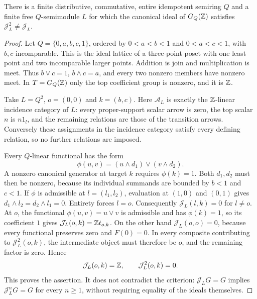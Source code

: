 \begin{proposition}
\label{prop:canonical-nonidempotent}
There is a finite distributive, commutative, entire idempotent semiring
$Q$ and a finite free $Q$-semimodule $L$ for which the canonical ideal
of $G_Q(\mathbb Z)$ satisfies $\mathcal J_L^2\ne\mathcal J_L$.
\end{proposition}
\begin{proof}
Let $Q=\{0,a,b,c,1\}$, ordered by
$0<a<b<1$ and $0<a<c<1$, with $b,c$ incomparable.
This is the ideal lattice of a three-point poset with one least point
and two incomparable larger points. Addition is join and multiplication
is meet. Thus $b\vee c=1$, $b\wedge c=a$, and every two nonzero
members have nonzero meet. In $T=G_Q(\mathbb Z)$ only the top coefficient
group is nonzero, and it is $\mathbb Z$.

Take $L=Q^2$, $o=(0,0)$ and $k=(b,c)$. Here $\mathcal A_L$ is exactly
the $\mathbb Z$-linear incidence category of $L$: every proper-support scalar
arrow is zero, the top scalar $n$ is $n1_l$, and the remaining relations
are those of the transition arrows. Conversely these assignments in the
incidence category satisfy every defining relation, so no further
relations are imposed.

Every $Q$-linear functional has the form
\[
 \phi(u,v)=(u\wedge d_1)\vee(v\wedge d_2).
\]
A nonzero canonical generator at target $k$ requires $\phi(k)=1$.
Both $d_1,d_2$ must then be nonzero, because its individual summands
are bounded by $b<1$ and $c<1$. If $\phi$ is admissible at
$l=(l_1,l_2)$, evaluation at $(1,0)$ and $(0,1)$ gives
$d_1\wedge l_2=d_2\wedge l_1=0$. Entirety forces $l=o$.
Consequently $\mathcal J_L(l,k)=0$ for $l\ne o$.
At $o$, the functional $\phi(u,v)=u\vee v$ is admissible and has
$\phi(k)=1$, so its coefficient $1$ gives
$\mathcal J_L(o,k)=\mathbb Z t_{o,k}$. On the other hand
$\mathcal J_L(o,o)=0$, because every functional preserves zero and
$F(0)=0$. In every composite contributing to
$\mathcal J_L^2(o,k)$, the intermediate object must therefore be $o$,
and the remaining factor is zero. Hence
\[
 \mathcal J_L(o,k)=\mathbb Z,\qquad \mathcal J_L^2(o,k)=0.
\]
This proves the assertion. It does not contradict the criterion:
$\mathcal J_LG=G$ implies $\mathcal J_L^nG=G$ for every $n\geq1$,
without requiring equality of the ideals themselves.
\end{proof}

